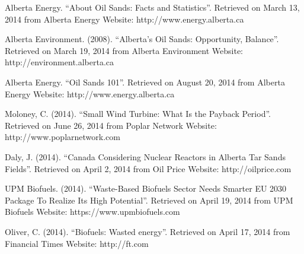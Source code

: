 \documentclass[11pt]{article}
\begin{document}
\begin{thebibliography}{9}
 Alberta Energy. ``About Oil Sands: Facts and Statistics''. Retrieved on March 13, 2014 from Alberta Energy Website: http://www.energy.alberta.ca
 
  Alberta Environment. (2008). ``Alberta's Oil Sands: Opportunity, Balance''. Retrieved on March 19, 2014 from Alberta Environment Website: http://environment.alberta.ca
 
 Alberta Energy. ``Oil Sands 101''. Retrieved on August 20, 2014 from Alberta Energy Website: http://www.energy.alberta.ca

 Moloney, C. (2014). ``Small Wind Turbine: What Is the Payback Period''. Retrieved on June 26, 2014 from Poplar Network Website: http://www.poplarnetwork.com
 
 Daly, J. (2014). ``Canada Considering Nuclear Reactors in Alberta Tar Sands Fields''. Retrieved on April 2, 2014 from Oil Price Website: http://oilprice.com
 
 UPM Biofuels. (2014). ``Waste-Based Biofuels Sector Needs Smarter EU 2030 Package To Realize Its High Potential''. Retrieved on April 19, 2014 from UPM Biofuels Website: https://www.upmbiofuels.com
 
 Oliver, C. (2014). ``Biofuels: Wasted energy''. Retrieved on April 17, 2014 from Financial Times Website: http://ft.com	

\end{thebibliography}
\end{document}
